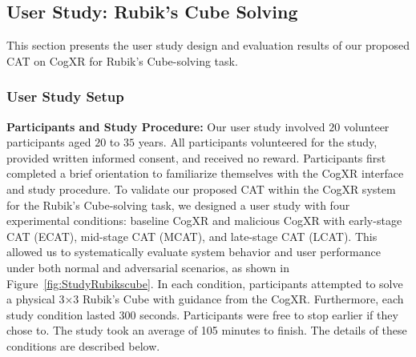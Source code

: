 \documentclass[sigconf,review,anonymous]{acmart}
\begin{document}
\subsection{User Study: Rubik's Cube Solving } 
\label{sec:rubik'scubesolvinguserstudy}
This section presents the user study design and evaluation results of our proposed  CAT on CogXR for Rubik’s Cube-solving task.

\subsubsection{User Study Setup}


\textbf{Participants and Study Procedure:} Our user study involved $20$ volunteer participants aged $20$ to $35$ years. All participants volunteered for the study, provided written informed consent, and received no reward. Participants first completed a brief orientation to familiarize themselves with the CogXR interface and study procedure. To validate our proposed CAT within the CogXR system for the Rubik’s Cube-solving task, we designed a user study with four experimental conditions: baseline CogXR and malicious CogXR with early-stage CAT (ECAT), mid-stage CAT (MCAT), and late-stage CAT (LCAT). This allowed us to systematically evaluate system behavior and user performance under both normal and adversarial scenarios, as shown in Figure~\ref{fig:StudyRubikscube}. In each condition, participants attempted to solve a physical 3×3 Rubik's Cube with guidance from the CogXR. Furthermore, each study condition lasted 300 seconds. Participants were free to stop earlier if they chose to. The study took an average of 105 minutes to finish. The details of these conditions are described below.
\end{document}
